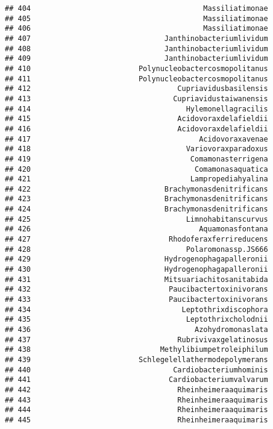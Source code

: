 \documentclass[
]{article}
\begin{document}
\begin{verbatim}
## 404                                        Massiliatimonae
## 405                                        Massiliatimonae
## 406                                        Massiliatimonae
## 407                               Janthinobacteriumlividum
## 408                               Janthinobacteriumlividum
## 409                               Janthinobacteriumlividum
## 410                         Polynucleobactercosmopolitanus
## 411                         Polynucleobactercosmopolitanus
## 412                                  Cupriavidusbasilensis
## 413                                 Cupriavidustaiwanensis
## 414                                    Hylemonellagracilis
## 415                                  Acidovoraxdelafieldii
## 416                                  Acidovoraxdelafieldii
## 417                                       Acidovoraxavenae
## 418                                    Variovoraxparadoxus
## 419                                     Comamonasterrigena
## 420                                      Comamonasaquatica
## 421                                     Lampropediahyalina
## 422                               Brachymonasdenitrificans
## 423                               Brachymonasdenitrificans
## 424                               Brachymonasdenitrificans
## 425                                    Limnohabitanscurvus
## 426                                       Aquamonasfontana
## 427                                Rhodoferaxferrireducens
## 428                                    Polaromonassp.JS666
## 429                               Hydrogenophagapalleronii
## 430                               Hydrogenophagapalleronii
## 431                               Mitsuariachitosanitabida
## 432                                Paucibactertoxinivorans
## 433                                Paucibactertoxinivorans
## 434                                   Leptothrixdiscophora
## 435                                    Leptothrixcholodnii
## 436                                      Azohydromonaslata
## 437                                  Rubrivivaxgelatinosus
## 438                              Methylibiumpetroleiphilum
## 439                         Schlegelellathermodepolymerans
## 440                                 Cardiobacteriumhominis
## 441                                Cardiobacteriumvalvarum
## 442                                  Rheinheimeraaquimaris
## 443                                  Rheinheimeraaquimaris
## 444                                  Rheinheimeraaquimaris
## 445                                  Rheinheimeraaquimaris

\end{verbatim}
\end{document}
